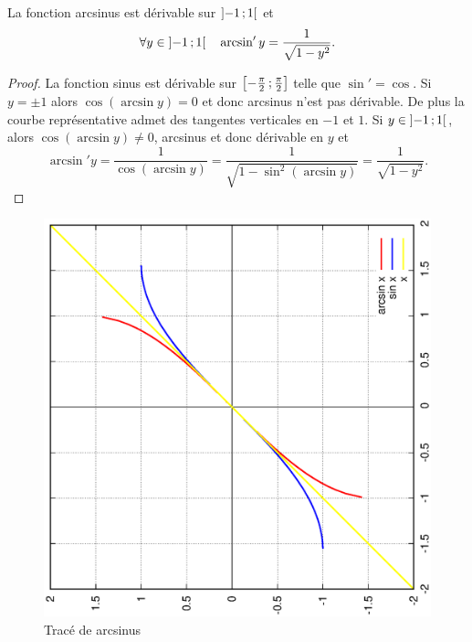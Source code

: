 %
\begin{prop} 
  La fonction arcsinus est dérivable sur $\left] -1 \, ;  1 \right[$ et 
  \begin{equation}
    \forall y \in \left] -1 \, ;  1 \right[ \quad \arcsin'y = \frac{1}{\sqrt{1-y^2}}.
  \end{equation}
\end{prop}
\begin{proof} 
  La fonction sinus est dérivable sur $\left[ -\frac{\pi}{2} \, ;  \frac{\pi}{2} \right]$ telle que $\sin'=\cos$. Si $y=\pm 1$ alors $\cos(\arcsin y)=0$ et donc arcsinus n'est pas dérivable. De plus la courbe représentative admet des tangentes verticales en $-1$ et $1$. Si $y \in \left] -1 \, ;  1 \right[$, alors $\cos(\arcsin y) \neq 0$, arcsinus et donc dérivable en $y$ et 
  \begin{equation} 
    \arcsin' y = \frac{1}{\cos( \arcsin y)}=\frac{1}{\sqrt{1-\sin^2(\arcsin y)}}=\frac{1}{\sqrt{1-y^2}}.
  \end{equation}
\end{proof}
\begin{figure}
  \centering
  \includegraphics[scale=0.4,angle=-90]{arcsin.ps}
  \caption{Tracé de arcsinus}
  \label{fig:tracearcsinus}
\end{figure}
%
